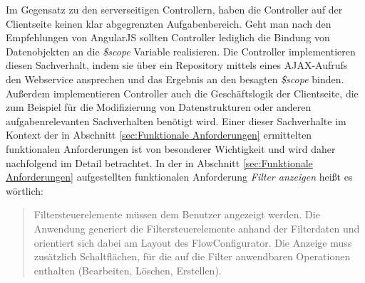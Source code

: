 Im Gegensatz zu den serverseitigen Controllern, haben die Controller auf der Clientseite keinen klar abgegrenzten Aufgabenbereich. Geht man nach den Empfehlungen von AngularJS sollten Controller lediglich die Bindung von Datenobjekten an die \emph{\$scope} Variable realisieren. Die Controller implementieren diesen Sachverhalt, indem sie über ein Repository mittels eines \ac{AJAX}-Aufrufs den Webservice ansprechen und das Ergebnis an den besagten \emph{\$scope} binden. Außerdem implementieren Controller auch die Geschäftslogik der Clientseite, die zum Beispiel für die Modifizierung von Datenstrukturen oder anderen aufgabenrelevanten Sachverhalten benötigt wird. Einer dieser Sachverhalte im Kontext der in Abschnitt \ref{sec:Funktionale Anforderungen} ermittelten funktionalen Anforderungen ist von besonderer Wichtigkeit und wird daher nachfolgend im Detail betrachtet. In der in Abschnitt \ref{sec:Funktionale Anforderungen} aufgestellten funktionalen Anforderung \glqq{}\emph{Filter anzeigen}\grqq{} heißt es wörtlich: 
\begin{quote}
Filtersteuerelemente müssen dem Benutzer angezeigt werden. Die Anwendung generiert die Filtersteuerelemente anhand der Filterdaten und orientiert sich dabei am Layout des FlowConfigurator. Die Anzeige muss zusätzlich Schaltflächen, für die auf die Filter anwendbaren Operationen enthalten (Bearbeiten, Löschen, Erstellen).
\end{quote}

